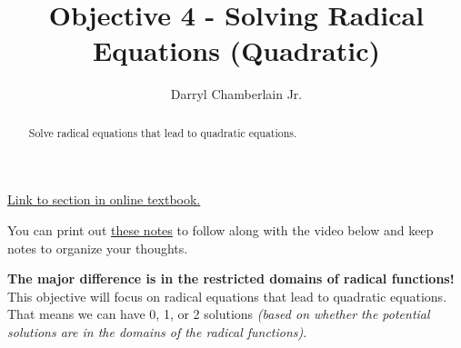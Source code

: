 \documentclass{ximera}
\author{Darryl Chamberlain Jr.}
\title{Objective 4 - Solving Radical Equations (Quadratic)}
\begin{document}
\begin{abstract}
Solve radical equations that lead to quadratic equations. 
\end{abstract}
\maketitle

\href{https://cnx.org/contents/mwjClAV_@8.1:uI1As6DV@15/Other-Types-of-Equations}{Link to section in online textbook.}

You can print out \href{http://people.clas.ufl.edu/dchamberlain31/files/M5-Objective-4-Solving-Radical-Equations-that-Lead-to-Quadratics.pdf}{these notes} to follow along with the video below and keep notes to organize your thoughts.


\textbf{The major difference is in the restricted domains of radical functions!} This objective will focus on radical equations that lead to quadratic equations. That means we can have 0, 1, or 2 solutions \textit{(based on whether the potential solutions are in the domains of the radical functions)}. 



\end{document}
